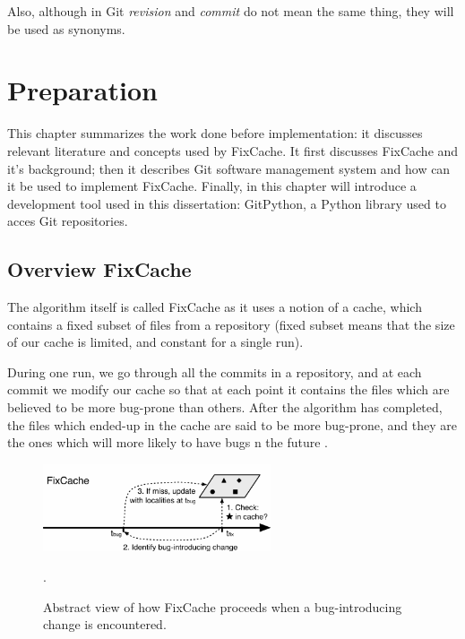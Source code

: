 \documentclass[12pt,twoside,notitlepage]{report}
\newcommand{\fxch}{FixCache}
\begin{document}
Also, although in Git \textit{revision} and \textit{commit} do not mean the same thing, they will be used as synonyms.
\cleardoublepage
\chapter{Preparation}
This chapter summarizes the work done before implementation: it discusses relevant literature and concepts used by \fxch{}. It first discusses \fxch{} and it's background; then it describes Git \cite{TorvaldsGit} software management system and how can it be used to implement \fxch{}. Finally, in this chapter will introduce a development tool used in this dissertation: GitPython, a Python library used to acces Git repositories.
\section{Overview \fxch{}}
The algorithm itself is called \fxch{} as it uses a notion of a cache, which contains a fixed subset of files from a repository (fixed subset means that the size of our cache is limited, and constant for a single run). 

During one run, we go through all the commits in a repository, and at each commit we modify our cache so that at each point it contains the files which are believed to be more bug-prone than others. After the algorithm has completed, the files which ended-up in the cache are said to be more bug-prone, and they are the ones which will more likely to have bugs n the future \cite{FixCache}.
\clearpage
\begin{figure}[h]
\includegraphics[width=0.6\textwidth]{fixcache_figure.png}
\centering
\captionsetup{width=0.6\textwidth}
\caption{Abstract view of how \fxch{} proceeds when a bug-introducing change is encountered.}.
\label{fixcache_figure}
\end{figure}
\end{document}
